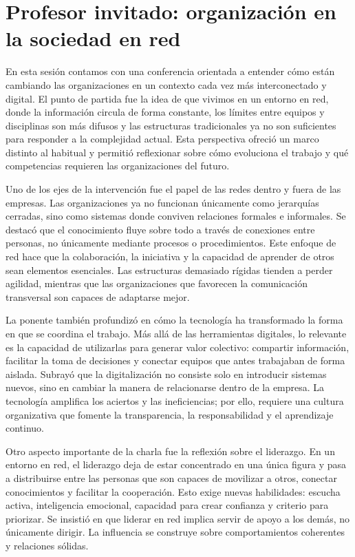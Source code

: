 \chapter{Profesor invitado: organización en la sociedad en red}

En esta sesión contamos con una conferencia orientada a entender cómo están cambiando las organizaciones en un contexto cada vez más interconectado y digital. El punto de partida fue la idea de que vivimos en un entorno en red, donde la información circula de forma constante, los límites entre equipos y disciplinas son más difusos y las estructuras tradicionales ya no son suficientes para responder a la complejidad actual. Esta perspectiva ofreció un marco distinto al habitual y permitió reflexionar sobre cómo evoluciona el trabajo y qué competencias requieren las organizaciones del futuro.

Uno de los ejes de la intervención fue el papel de las redes dentro y fuera de las empresas. Las organizaciones ya no funcionan únicamente como jerarquías cerradas, sino como sistemas donde conviven relaciones formales e informales. Se destacó que el conocimiento fluye sobre todo a través de conexiones entre personas, no únicamente mediante procesos o procedimientos. Este enfoque de red hace que la colaboración, la iniciativa y la capacidad de aprender de otros sean elementos esenciales. Las estructuras demasiado rígidas tienden a perder agilidad, mientras que las organizaciones que favorecen la comunicación transversal son capaces de adaptarse mejor.

La ponente también profundizó en cómo la tecnología ha transformado la forma en que se coordina el trabajo. Más allá de las herramientas digitales, lo relevante es la capacidad de utilizarlas para generar valor colectivo: compartir información, facilitar la toma de decisiones y conectar equipos que antes trabajaban de forma aislada. Subrayó que la digitalización no consiste solo en introducir sistemas nuevos, sino en cambiar la manera de relacionarse dentro de la empresa. La tecnología amplifica los aciertos y las ineficiencias; por ello, requiere una cultura organizativa que fomente la transparencia, la responsabilidad y el aprendizaje continuo.

Otro aspecto importante de la charla fue la reflexión sobre el liderazgo. En un entorno en red, el liderazgo deja de estar concentrado en una única figura y pasa a distribuirse entre las personas que son capaces de movilizar a otros, conectar conocimientos y facilitar la cooperación. Esto exige nuevas habilidades: escucha activa, inteligencia emocional, capacidad para crear confianza y criterio para priorizar. Se insistió en que liderar en red implica servir de apoyo a los demás, no únicamente dirigir. La influencia se construye sobre comportamientos coherentes y relaciones sólidas.

